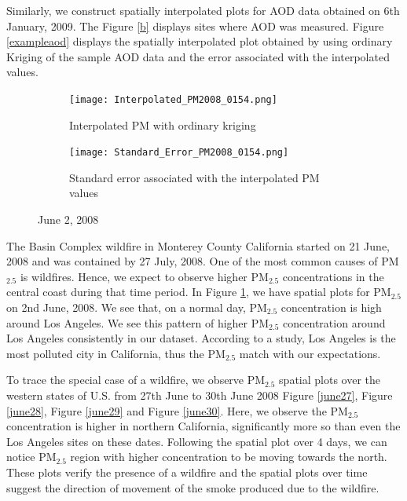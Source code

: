 \documentclass[10pt]{article}
\newcommand{\kelly}[1]{{\color{blue}{Kelly: {#1}}}}
\begin{document}
Similarly, we construct spatially interpolated plots for AOD data obtained on 6th January, 2009. The Figure \ref{b} displays sites where AOD was measured. Figure \ref{exampleaod} displays the spatially interpolated plot obtained by using ordinary Kriging of the sample AOD data and the error associated with the interpolated values.



\begin{figure}[H]
\centering
\begin{subfigure}{.5\textwidth}
  \centering
  \texttt{[image: Interpolated\_PM2008\_0154.png]}
  \caption{ Interpolated PM with ordinary kriging}
\end{subfigure}%
\begin{subfigure}{.5\textwidth}
  \centering
  \texttt{[image: Standard\_Error\_PM2008\_0154.png]}
  \caption{Standard error associated with the interpolated PM values}
\end{subfigure}
\caption{June 2, 2008}
\label{normalday}
\end{figure}



The Basin Complex wildfire in Monterey County California started on 21 June, 2008 and was contained by 27 July, 2008. One of the most common causes of PM$_{2.5}$ is wildfires. Hence, we expect to observe higher PM$_{2.5}$ concentrations in the central coast during that time period. In Figure \ref{normalday}, we have spatial plots for PM$_{2.5}$ on 2nd June, 2008. We see that, on a normal day, PM$_{2.5}$ concentration is high around Los Angeles. We see this pattern of higher PM$_{2.5}$ concentration around Los Angeles consistently in our dataset. According to a study, Los Angeles is the most polluted city in California, thus the PM$_{2.5}$ match with our expectations. \kelly{insert study citation}



To trace the special case of a wildfire, we observe PM$_{2.5}$ spatial plots over the western states of U.S. from 27th June to 30th June 2008 Figure \ref{june27}, Figure \ref{june28}, Figure \ref{june29} and Figure \ref{june30}. Here, we observe the PM$_{2.5}$ concentration is higher in northern California, significantly more so than even the Los Angeles sites on these dates. Following the spatial plot over 4 days, we can notice PM$_{2.5}$ region with higher concentration to be moving towards the north. These plots verify the presence of a wildfire and the spatial plots over time suggest the direction of movement of the smoke produced due to the wildfire. 
\end{document}
